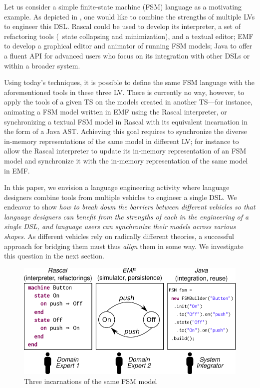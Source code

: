 \documentclass[sigplan]{acmart}
\begin{document}
Let us consider a simple finite-state machine (FSM) language as a motivating example.
As depicted in , one would like to combine the strengths of multiple LVs to engineer this DSL.
Rascal could be used to develop its interpreter, a set of refactoring tools (\eg~state collapsing and minimization), and a textual editor; EMF to develop a graphical editor and animator of running FSM models; Java to offer a fluent API for advanced users who focus on its integration with other DSLs or within a broader system.

Using today's techniques, it is possible to define the same FSM language with the aforementioned tools in these three LV.
There is currently no way, however, to apply the tools of a given TS on the models created in another TS---for instance, animating a FSM model written in EMF using the Rascal interpreter, or synchronizing a textual FSM model in Rascal with its equivalent incarnation in the form of a Java AST.
Achieving this goal requires to synchronize the diverse in-memory representations of the same model in different LV; for instance to allow the Rascal interpreter to update its in-memory representation of an FSM model and synchronize it with the in-memory representation of the same model in EMF.

In this paper, we envision a language engineering activity where language designers combine tools from multiple vehicles to engineer a single DSL.
We endeavor to show \emph{how to break down the barriers between different vehicles so that language designers can benefit from the strengths of each in the engineering of a single DSL, and language users can synchronize their models across various shapes}.
As different vehicles rely on radically different theories, a successful approach for bridging them must thus \emph{align}  them in some way.
We investigate this question in the next section.

\begin{figure}[bt]
	\centering
	\includegraphics[width=\columnwidth]{figures/motivating-fsm-simplified}
	\caption{Three incarnations of the same FSM model}
	\label{fig:motivating-fsm}
\end{figure}
\end{document}

